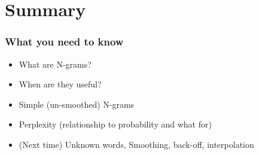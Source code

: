 \documentclass{beamer}
\begin{document}
%    
%    
%
%
%
% 


\section{Summary}
\begin{frame}
\frametitle{What you need to know}
\begin{itemize}
	\item What are N-grams?
	\item When are they useful?
	\item Simple (un-smoothed) N-grams
	\item Perplexity (relationship to probability and what for)
	\item (Next time) Unknown words, Smoothing, back-off, interpolation
\end{itemize}
\end{frame}



\end{document}
